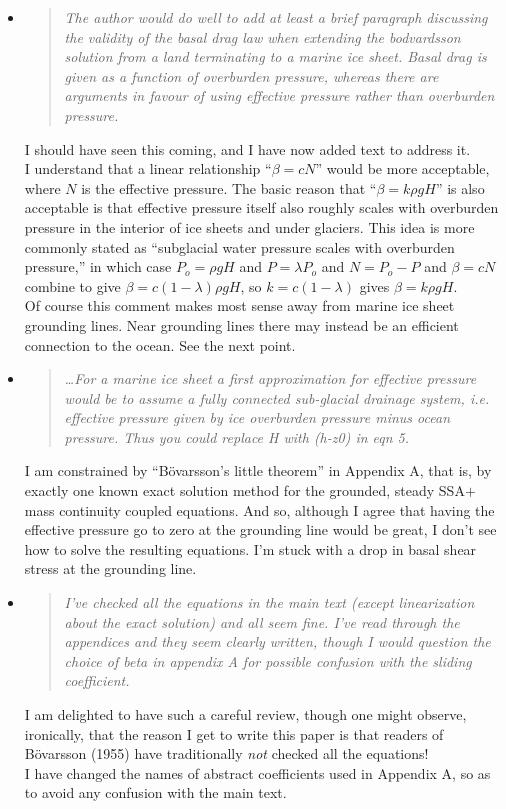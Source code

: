 \documentclass[11pt,reqno]{amsart}
\renewcommand{\dh}{\fontencoding{T1}\selectfont{\symbol{240}}}
\newcommand{\bod}{B\"o\dh varsson\xspace}
\newcommand{\citebod}{B\"o\dh varsson (1955)\nocite{Bodvardsson}\xspace}
\newcommand{\reply}[2]{
\medskip\medskip
\item  \begin{quote}
\emph{#1}
\end{quote}

\medskip
\noindent #2}
\begin{document}
\begin{itemize}
\reply{The author would do well to add at least a brief paragraph discussing the validity of the basal drag law when extending the bodvardsson solution from a land terminating to a marine ice sheet.  Basal drag is given as a function of overburden pressure, whereas there are arguments in favour of using effective pressure rather than overburden pressure.}
{I should have seen this coming, and I have now added text to address it. \medskip \\
I understand that a linear relationship ``$\beta = c N$'' would be more acceptable, where $N$ is the effective pressure.  The basic reason that ``$\beta = k \rho g H$'' is also acceptable is that effective pressure itself also roughly scales with overburden pressure in the interior of ice sheets and under glaciers.  This idea is more commonly stated as ``subglacial water pressure scales with overburden pressure,'' in which case $P_o = \rho g H$ and $P=\lambda P_o$ and $N=P_o - P$ and $\beta = c N$ combine to give $\beta = c (1 - \lambda) \rho g H$, so $k=c(1-\lambda)$ gives $\beta = k \rho g H$.
\medskip \\
Of course this comment makes most sense away from marine ice sheet grounding lines.  Near grounding lines there may instead be an efficient connection to the ocean.  See the next point.}

\reply{\dots For a marine ice sheet a first approximation for effective pressure would be to assume a fully connected sub-glacial drainage system, i.e. effective pressure given by ice overburden pressure minus ocean pressure. Thus you could replace H with (h-z0) in eqn 5.}
{I am constrained by ``\bod's little theorem'' in Appendix A, that is, by exactly one known exact solution method for the grounded, steady SSA$+$mass continuity coupled equations.  And so, although I agree that having the effective pressure go to zero at the grounding line would be great, I don't see how to solve the resulting equations.  I'm stuck with a drop in basal shear stress at the grounding line.}

\reply{I've checked all the equations in the main text (except linearization about the exact solution) and all seem fine. I've read through the appendices and they seem clearly written, though I would question the choice of beta in appendix A for possible confusion with the sliding coefficient.}
{I am delighted to have such a careful review, though one might observe, ironically, that the reason I get to write this paper is that readers of \citebod have traditionally \emph{not} checked all the equations! \medskip \\
I have changed the names of abstract coefficients used in Appendix A, so as to avoid any confusion with the main text.}


\end{itemize}
\end{document}
